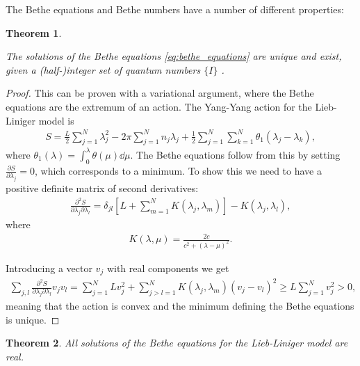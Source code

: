 \documentclass[11pt, a4paper]{report} %
\newtheorem{theorem}{Theorem}
\begin{document}
The Bethe equations and Bethe numbers have a number of different properties:

\begin{theorem}\label{th:convexity}
\begin{sloppypar}
\noindent
The solutions of the Bethe equations \cref{eq:bethe_equations} are unique and exist, given a \mbox{(half-)integer} set of quantum numbers \(\{I\}\) \textup{\cite{Yang1969}}.
\end{sloppypar}
\end{theorem}
\begin{proof}
This can be proven with a variational argument, where the Bethe equations are the extremum of an action.
The Yang-Yang action for the Lieb-Liniger model is
\begin{align}
	S= \frac{L}{2} \sum_{j=1}^{N} \lambda_j^2 - 2\pi\sum_{j=1}^{N} n_j \lambda_j + \frac{1}{2} \sum_{j=1}^N \sum_{k=1}^{N} \theta_1(\lambda_j - \lambda_k),
\end{align}
where \(\theta_1(\lambda) = \int_0^{\lambda} \theta(\mu)\dd\mu\).
The Bethe equations follow from this by setting \(\frac{\partial S}{\partial \lambda_j} = 0\), which corresponds to a minimum.
To show this we need to have a positive definite matrix of second derivatives:
\begin{align}
	\frac{\partial^2S}{\partial\lambda_j\partial\lambda_l} = \delta_{jl} \left[L + \sum_{m=1}^{N} K(\lambda_j,\lambda_m)\right] - K(\lambda_j, \lambda_l),
\end{align}
where 
\begin{align}
	K(\lambda, \mu) = \frac{2c}{c^2 + (\lambda - \mu)^2}.
\end{align}

Introducing a vector \(v_j\) with real components we get~\cite{Korepin1993}
\begin{align}
  	\sum_{j,l}\frac{\partial^2S}{\partial\lambda_j\partial\lambda_l} v_jv_l = \sum_{j=1}^NL v_{j}^2 + \sum_{j>l=1}^{N} K(\lambda_j,\lambda_m) (v_j - v_l)^2 \geq L \sum_{j=1}^Nv_j^{2} > 0,
\end{align}
meaning that the action is convex and the minimum defining the Bethe equations is unique.
\end{proof}

\begin{theorem}
All solutions of the Bethe equations for the Lieb-Liniger model are real.
\end{theorem}
\end{document}
